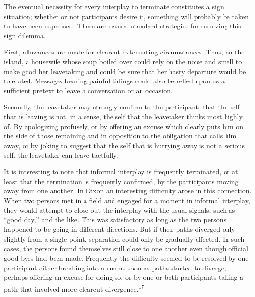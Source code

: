 \documentclass[twoside,symmetric,nobib,justified]{tufte-book}
\begin{document}
The eventual necessity for every interplay to terminate constitutes a
sign situation; whether or not participants desire it, something will
probably be taken to have been expressed. There are several standard
strategies for resolving this sign dilemma.

First, allowances are made for clearcut extenuating circumstances. Thus,
on the island, a housewife whose soup boiled over could rely on the
noise and smell to make good her leavetaking and could be sure that her
hasty departure would be tolerated. Messages bearing painful tidings
could also be relied upon as a sufficient pretext to leave a
conversation or an occasion.

Secondly, the leavetaker may strongly confirm to the participants that
the self that is leaving is not, in a sense, the self that the
leavetaker thinks most highly of. By apologizing profusely, or by
offering an excuse which clearly puts him on the side of those remaining
and in opposition to the obligation that calls him away, or by joking to
suggest that the self that is hurrying away is not a serious self, the
leavetaker can leave tactfully.

It is interesting to note that informal interplay is frequently
terminated, or at least that the termination is frequently confirmed, by
the participants moving away from one another. In Dixon an interesting
difficulty arose in this connection. When two persons met in a field and
engaged for a moment in informal interplay, they would attempt to close
out the interplay with the usual signals, such as ``good day,'' and the
like. This was satisfactory as long as the two persons happened to be
going in different directions. But if their paths diverged only slightly
from a single point, separation could only be gradually effected. In
such cases, the persons found themselves still close to one another even
though official good-byes had been made. Frequently the difficulty
seemed to be resolved by one participant either breaking into a run as
soon as paths started to diverge, perhaps offering an excuse for doing
so, or by one or both participants taking a path that involved more
clearcut divergence.\textsuperscript{17}
\end{document}
